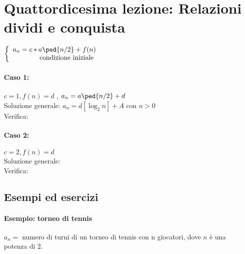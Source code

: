 \section{Quattordicesima lezione: Relazioni dividi e conquista}
\( \left\{ 
    \begin{array}{rcl}
    a_n = c* a\ped{n/2} + f(n) \\
     \mbox{condizione iniziale }
    \end{array}
     \right. \)
\paragraph{Caso 1:} \(c =1, f(n)=d\) , \( a_n = a\ped{n/2}+ d\) \\
Soluzione generale: \(a_n = d [\log_2 n ]+ A\) con $n>0$ \\ 
Verifica: \\
\paragraph{Caso 2:}   \(c=2, f(n)  =d\) \\
Soluzione generale: \\
Verifica: \\

\subsection{Esempi ed esercizi}
\paragraph{Esempio: torneo di tennis} $a_n =$ numero di turni di un torneo di tennis con n giocatori, dove $n$ è una potenza di 2.





\newpage
